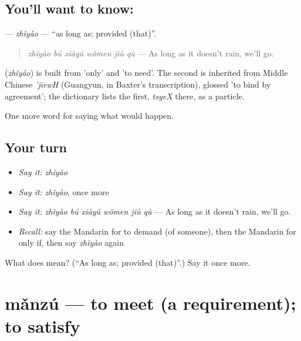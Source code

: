 \subsection*{You'll want to know: }
\textbf{} — \emph{zhǐyào} — \textquotedblleft{}as long as; provided (that)\textquotedblright{}.

\begin{quote}
\textbf{} \emph{zhǐyào bú xiàyǔ wǒmen jiù qù} — As long as it doesn't rain, we'll go.
\end{quote}

\begin{cousinweb}
\textbf{} (\emph{zhǐyào}) is built from  'only' and  'to need'. The second is inherited from Middle Chinese \emph{'jiewH} (Guangyun, in Baxter's transcription), glossed 'to bind by agreement'; the dictionary lists the first, \emph{tsyeX} there, as a particle.
\end{cousinweb}

\begin{grammarlens}[title={What you've built}]
One more word for saying what would happen.
\end{grammarlens}

\subsection*{Your turn}
\begin{itemize}
\raggedright
  \item \emph{Say it:} \emph{zhǐyào}
  \item \emph{Say it:} \emph{zhǐyào}, once more
  \item \emph{Say it:} \emph{zhǐyào bú xiàyǔ wǒmen jiù qù} — As long as it doesn't rain, we'll go.
  \item \emph{Recall:} say the Mandarin for to demand (of someone), then the Mandarin for only if, then say \emph{zhǐyào} again
\end{itemize}

\begin{tcolorbox}[breakable,colback=teal!4,colframe=teal!35!black,title={Before you move on}]
What does  mean? (\textquotedblleft{}As long as; provided (that)\textquotedblright{}.) Say it once more.
\end{tcolorbox}
\section[mǎnzú]{mǎnzú — to meet (a requirement); to satisfy}

